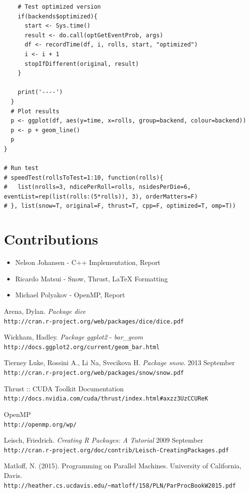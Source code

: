 \documentclass[12pt]{article}
\begin{document}
\begin{lstlisting}
    # Test optimized version
    if(backends$optimized){
      start <- Sys.time()
      result <- do.call(optGetEventProb, args)
      df <- recordTime(df, i, rolls, start, "optimized")
      i <- i + 1
      stopIfDifferent(original, result)
    }
    
    print('----')
  }
  # Plot results
  p <- ggplot(df, aes(y=time, x=rolls, group=backend, colour=backend))
  p <- p + geom_line()
  p
}

# Run test
# speedTest(rollsToTest=1:10, function(rolls){
#   list(nrolls=3, ndicePerRoll=rolls, nsidesPerDie=6, eventList=rep(list(rolls:(5*rolls)), 3), orderMatters=F)
# }, list(snow=T, original=F, thrust=T, cpp=F, optimized=T, omp=T))
\end{lstlisting}

\section{Contributions}
\begin{itemize}
\item Nelson Johansen - C++ Implementation, Report
\item Ricardo Matsui - Snow, Thrust, LaTeX Formatting
\item Michael Polyakov - OpenMP, Report
\end{itemize}

\begin{thebibliography}{1}
	
 Arena, Dylan. \textit{Package dice} 
 \\\texttt{http://cran.r-project.org/web/packages/dice/dice.pdf}

 Wickham, Hadley. \textit{ Package ggplot2 } - {\em bar\_geom } 
 \\\texttt{http://docs.ggplot2.org/current/geom\_bar.html}

 Tierney Luke, Rossini A., Li Na, Svecikova H.  \textit{Package snow}. 2013 September
 \\\texttt{http://cran.r-project.org/web/packages/snow/snow.pdf}

 Thrust :: CUDA Toolkit Documentation
 \\\texttt{http://docs.nvidia.com/cuda/thrust/index.html\#axzz3UzCCUReK}

 OpenMP
 \\\texttt{http://openmp.org/wp/}

 Leisch, Friedrich. \textit{Creating R Packages: A Tutorial} 2009 September
 \\\texttt{http://cran.r-project.org/doc/contrib/Leisch-CreatingPackages.pdf}
 
  Matloff, N. (2015). Programming on Parallel Machines. University of California, Davis.
 \\\texttt{http://heather.cs.ucdavis.edu/\textasciitilde matloff/158/PLN/ParProcBookW2015.pdf}
	
\end{thebibliography}
\end{document}
